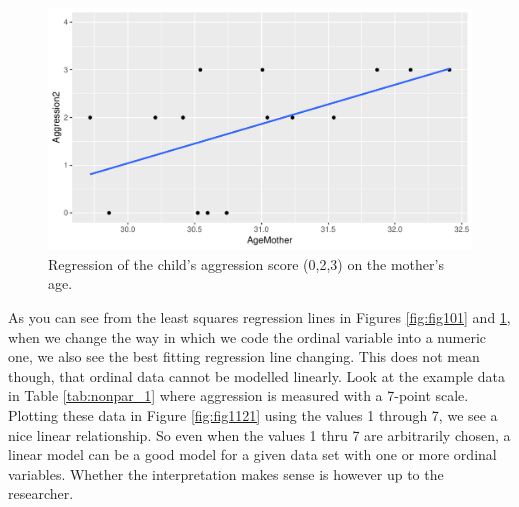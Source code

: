 \documentclass[]{book}\usepackage[]{graphicx}\usepackage[]{color}
\makeatletter
\def\maxwidth{ %
  \ifdim\Gin@nat@width>\linewidth
    \linewidth
  \else
    \Gin@nat@width
  \fi
}
\newenvironment{knitrout}{}{} %
\makeatother
\begin{document}
\begin{knitrout}
\color{fgcolor}\begin{figure}

{\centering \includegraphics[width=\maxwidth]{figure/fig1114-1} 

}

\caption[Regression of the child's aggression score (0,2,3) on the mother's age]{Regression of the child's aggression score (0,2,3) on the mother's age.}\label{fig:fig1114}
\end{figure}


\end{knitrout}

As you can see from the least squares regression lines in Figures \ref{fig:fig101} and \ref{fig:fig1114}, when we change the way in which we code the ordinal variable into a numeric one, we also see the best fitting regression line changing. This does not mean though, that ordinal data cannot be modelled linearly. Look at the example data in Table \ref{tab:nonpar_1} where aggression is measured with a 7-point scale. Plotting these data in Figure \ref{fig:fig1121} using the values 1 through 7, we see a nice linear relationship. So even when the values 1 thru 7 are arbitrarily chosen, a linear model can be a good model for a given data set with one or more ordinal variables. Whether the interpretation makes sense is however up to the researcher. 
\end{document}
